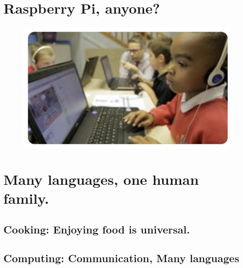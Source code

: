 \documentclass[]{report}
\begin{document}
\chapter{Raspberry Pi, anyone?}
\begin{figure}
	\centering
	\includegraphics[width=0.7\linewidth]{childCoding}
	\caption{}
	\label{fig:pienetwork}
\end{figure}

\chapter{Many languages, one human family.}
\section{Cooking: Enjoying food is universal.}
\section{Computing: Communication, Many languages}
\end{document}
